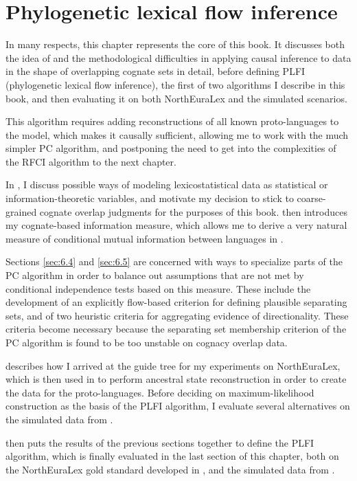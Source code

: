 \chapter{Phylogenetic lexical flow inference}\label{sec:6}
In many respects, this chapter represents the core of this book. It discusses both the idea of and the methodological difficulties in applying causal inference to data in the shape of overlapping cognate sets in detail, before defining PLFI (phylogenetic lexical flow inference), the first of two algorithms I describe in this book, and then evaluating it on both NorthEuraLex and the simulated scenarios.

This algorithm requires adding reconstructions of all known proto-languages to the model, which makes it causally sufficient, allowing me to work with the much simpler PC algorithm, and postponing the need to get into the complexities of the RFCI algorithm to the next chapter.

In , I discuss possible ways of modeling lexicostatistical data as statistical or information-theoretic variables, and motivate my decision to stick to coarse-grained cognate overlap judgments for the purposes of this book.  then introduces my cognate-based information measure, which allows me to derive a very natural measure of conditional mutual information between languages in .

Sections \ref{sec:6.4} and \ref{sec:6.5} are concerned with ways to specialize parts of the PC algorithm in order to balance out assumptions that are not met by conditional independence tests based on this measure. These include the development of an explicitly flow-based criterion for defining plausible separating sets, and of two heuristic criteria for aggregating evidence of directionality. These criteria become necessary because the separating set membership criterion of the PC algorithm is found to be too unstable on cognacy overlap data.

 describes how I arrived at the guide tree for my experiments on North\-Eu\-ra\-Lex, which is then used in  to perform ancestral state reconstruction in order to create the data for the proto-languages. Before deciding on maximum-likelihood construction as the basis of the PLFI algorithm, I evaluate several alternatives on the simulated data from .

 then puts the results of the previous sections together to define the PLFI algorithm, which is finally evaluated in the last section of this chapter, both on the NorthEuraLex gold standard developed in , and the simulated data from .

